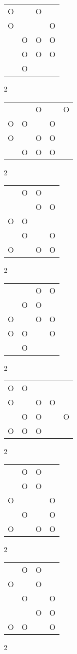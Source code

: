 \begin{tabular}{|m{0.2cm}m{0.2cm}m{0.2cm}m{0.2cm}|}\hline
O& &O& \\
O& & &O\\
 &O&O&O\\
 &O&O&O\\
 &O& & \\
\hline\end{tabular}2
\begin{tabular}{|m{0.2cm}m{0.2cm}m{0.2cm}m{0.2cm}m{0.2cm}|}\hline
 & &O& &O\\
O&O& &O& \\
O& &O&O& \\
 &O&O&O& \\
\hline\end{tabular}2
\begin{tabular}{|m{0.2cm}m{0.2cm}m{0.2cm}m{0.2cm}|}\hline
 &O&O& \\
 & &O&O\\
O&O& & \\
 &O& &O\\
O& &O&O\\
\hline\end{tabular}2
\begin{tabular}{|m{0.2cm}m{0.2cm}m{0.2cm}m{0.2cm}|}\hline
 & &O&O\\
 &O&O& \\
O& &O&O\\
O&O& &O\\
 &O& & \\
\hline\end{tabular}2
\begin{tabular}{|m{0.2cm}m{0.2cm}m{0.2cm}m{0.2cm}m{0.2cm}|}\hline
O&O& & & \\
O& &O&O& \\
 &O&O& &O\\
O&O&O& & \\
\hline\end{tabular}2
\begin{tabular}{|m{0.2cm}m{0.2cm}m{0.2cm}m{0.2cm}|}\hline
 &O&O& \\
 &O&O& \\
O& & &O\\
 &O& &O\\
O& &O&O\\
\hline\end{tabular}2
\begin{tabular}{|m{0.2cm}m{0.2cm}m{0.2cm}m{0.2cm}|}\hline
 &O&O& \\
O& &O& \\
 &O& &O\\
 & &O&O\\
O&O& &O\\
\hline\end{tabular}2
